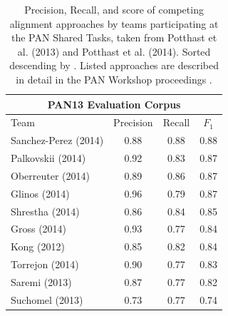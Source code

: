 \begin{table}[th]

\setlength{\tabcolsep}{4pt}%
\caption{Precision, Recall, and  score of competing alignment approaches by teams participating at the PAN Shared Tasks, taken from Potthast et al. (2013)\cite{potthast:2013} and Potthast et al. (2014)\cite{potthast:2014}. Sorted descending by .  Listed approaches are described in detail in the PAN Workshop proceedings \cite{pan:2012,pan:2013,pan:2014}.}
\label{tab:pan13}
\centering
\begin{tabular}{@{}l*{3}{c}}
\multicolumn{4}{c}{\bfseries PAN13 Evaluation Corpus} \\
\toprule
Team                & Precision     & Recall   & $F_1$   \\
\midrule
Sanchez-Perez (2014) &      0.88 &   0.88 &  0.88 \\
Palkovskii (2014)    &      0.92 &   0.83 &  0.87 \\
Oberreuter (2014)    &      0.89 &   0.86 &  0.87 \\
Glinos (2014)        &      0.96 &   0.79 &  0.87 \\
Shrestha (2014)      &      0.86 &   0.84 &  0.85 \\
Gross (2014)         &      0.93 &   0.77 &  0.84 \\
Kong (2012)          &      0.85 &   0.82 &  0.84 \\
Torrejon (2014)      &      0.90 &   0.77 &  0.83 \\
Saremi (2013)        &      0.87 &   0.77 &  0.82 \\
Suchomel (2013)      &      0.73 &   0.77 &  0.74 \\

\end{tabular}
\end{table}

